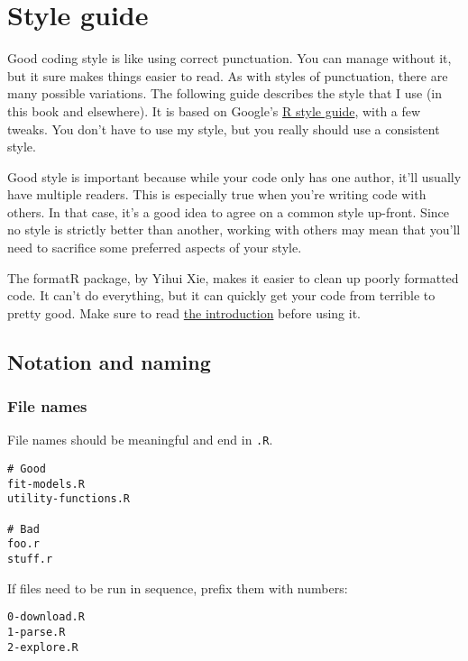 \chapter{Style guide}\label{style}

Good coding style is like using correct punctuation. You can manage
without it, but it sure makes things easier to read. As with styles of
punctuation, there are many possible variations. The following guide
describes the style that I use (in this book and elsewhere). It is based
on Google's
\href{http://google-styleguide.googlecode.com/svn/trunk/google-r-style.html}{R
style guide}, with a few tweaks. You don't have to use my style, but you
really should use a consistent style. 

Good style is important because while your code only has one author,
it'll usually have multiple readers. This is especially true when you're
writing code with others. In that case, it's a good idea to agree on a
common style up-front. Since no style is strictly better than another,
working with others may mean that you'll need to sacrifice some
preferred aspects of your style.

The formatR package, by Yihui Xie, makes it easier to clean up poorly
formatted code. It can't do everything, but it can quickly get your code
from terrible to pretty good. Make sure to read
\href{http://yihui.name/formatR/}{the introduction} before using it.

\section{Notation and naming}

\subsection{File names}

File names should be meaningful and end in \texttt{.R}.

\begin{verbatim}
# Good
fit-models.R
utility-functions.R

# Bad
foo.r
stuff.r
\end{verbatim}

If files need to be run in sequence, prefix them with numbers:

\begin{verbatim}
0-download.R
1-parse.R
2-explore.R
\end{verbatim}

